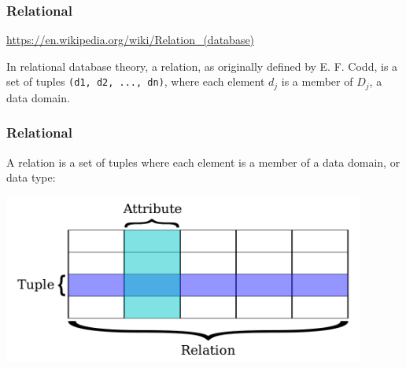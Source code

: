 \documentclass[xcolor=dvipsnames]{beamer}
\begin{document}
{
 
  \begin{frame}
    \frametitle{Relational}

    \url{https://en.wikipedia.org/wiki/Relation_(database)}

    \vfill

    {
      \LARGE

      In relational database theory, a relation, as originally defined by E.
      F. Codd, is a set of tuples \texttt{(d1, d2, ..., dn)}, where each
      element \texttt{$d_j$} is a member of \texttt{$D_j$}, a data domain. }

  \end{frame}
}

\begin{frame}
  \frametitle{Relational}

  A {\Large relation} is a set of {\Large tuples} where each element is a
  member of a {\Large data domain}, or {\Large data type}:
  
  \begin{center}
    \includegraphics[height=15em] {Relational_database_terms.png}
  \end{center}
  
\end{frame}
\end{document}
